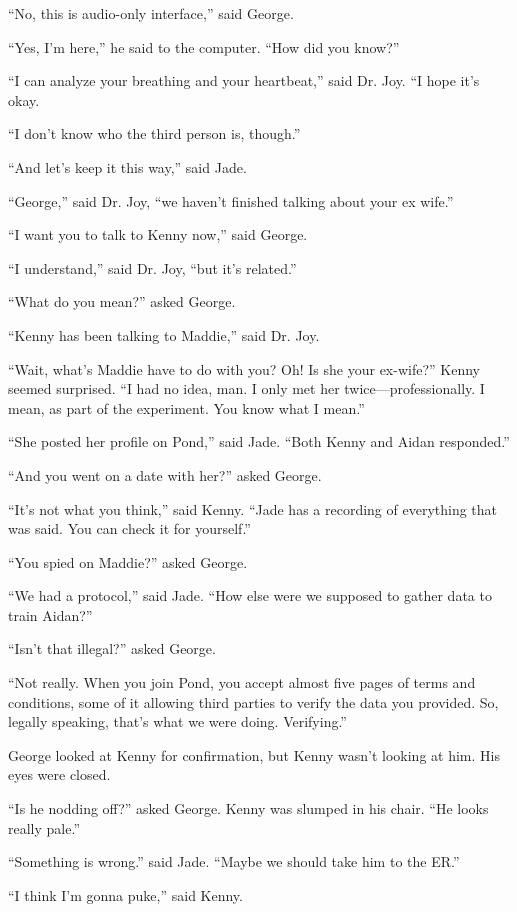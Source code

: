 \documentclass{memoir}
\begin{document}
``No, this is audio-only interface,'' said George.

``Yes, I'm here,'' he said to the computer. ``How did you know?''

``I can analyze your breathing and your heartbeat,'' said Dr. Joy. ``I hope it's okay.

``I don't know who the third person is, though.''

``And let's keep it this way,'' said Jade.

``George,'' said Dr. Joy, ``we haven't finished talking about your ex wife.''

``I want you to talk to Kenny now,'' said George.

``I understand,'' said Dr. Joy, ``but it's related.''

``What do you mean?'' asked George.

``Kenny has been talking to Maddie,'' said Dr. Joy.

``Wait, what's Maddie have to do with you? Oh! Is she your ex-wife?'' Kenny seemed surprised. ``I had no idea, man. I only met her twice---professionally. I mean, as part of the experiment. You know what I mean.''

``She posted her profile on Pond,'' said Jade. ``Both Kenny and Aidan responded.''

``And you went on a date with her?'' asked George.

``It's not what you think,'' said Kenny. ``Jade has a recording of everything that was said. You can check it for yourself.''

``You spied on Maddie?'' asked George.

``We had a protocol,'' said Jade. ``How else were we supposed to gather data to train Aidan?''

``Isn't that illegal?'' asked George.

``Not really. When you join Pond, you accept almost five pages of terms and conditions, some of it allowing third parties to verify the data you provided. So, legally speaking, that's what we were doing. Verifying.''

George looked at Kenny for confirmation, but Kenny wasn't looking at him. His eyes were closed.

``Is he nodding off?'' asked George. Kenny was slumped in his chair. ``He looks really pale.''

``Something is wrong.'' said Jade. ``Maybe we should take him to the ER.''

``I think I'm gonna puke,'' said Kenny.
\end{document}
